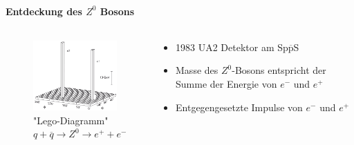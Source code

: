 \begin{iframe}
	\framesubtitle{Entdeckung des $Z^0$ Bosons}
	\begin{columns}
		\begin{column}{0.48\textwidth}
			\begin{figure}
				\includegraphics[width=5cm]{img/lego}
				\caption*{"Lego-Diagramm" $q+\overline{q} \rightarrow Z^0 \rightarrow e^+ + e^-$ \cite{povh}}
			\end{figure}
		\end{column}
		\begin{column}{0.48\textwidth}
				\begin{itemize}
					\item 1983 UA2 Detektor am Sp$\overline{\text{p}}$S
					\item Masse des $Z^0$-Bosons entspricht der Summe der Energie von $e^-$ und $e^+$
					\item Entgegengesetzte Impulse von $e^-$ und $e^+$
				\end{itemize}
		\end{column}
		\end{columns}
\end{iframe}


